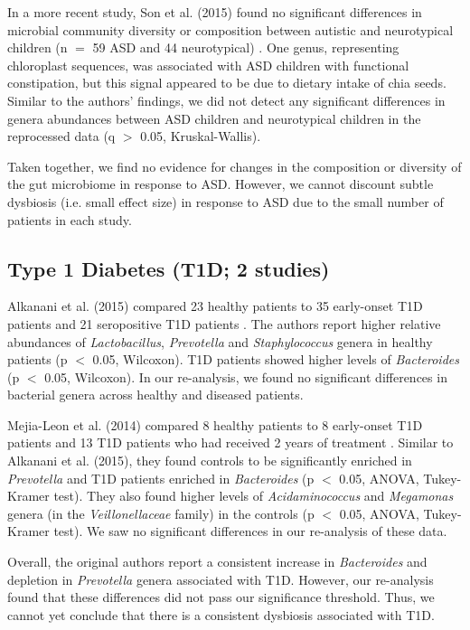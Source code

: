 \documentclass{article}
\begin{document}
{In a more recent study, Son et al. (2015) found no significant differences in microbial community diversity or composition between autistic and neurotypical children (n $=$ 59 ASD and 44 neurotypical) \cite{asd-son}. 
One genus, representing chloroplast sequences, was associated with ASD children with functional constipation, but this signal appeared to be due to dietary intake of chia seeds. 
Similar to the authors’ findings, we did not detect any significant differences in genera abundances between ASD children and neurotypical children in the reprocessed data (q $>$ 0.05, Kruskal-Wallis).

Taken together, we find no evidence for changes in the composition or diversity of the gut microbiome in response to ASD. 
However, we cannot discount subtle dysbiosis (i.e. small effect size) in response to ASD due to the small number of patients in each study.

\subsection*{Type 1 Diabetes (T1D; 2 studies)}

Alkanani et al. (2015) compared 23 healthy patients to 35 early-onset T1D patients and 21 seropositive T1D patients \cite{t1d-alkanani}. 
The authors report higher relative abundances of \textit{Lactobacillus}, \textit{Prevotella} and \textit{Staphylococcus} genera in healthy patients (p $<$ 0.05, Wilcoxon). 
T1D patients showed higher levels of \textit{Bacteroides} (p $<$ 0.05, Wilcoxon). 
In our re-analysis, we found no significant differences in bacterial genera across healthy and diseased patients.

Mejia-Leon et al. (2014) compared 8 healthy patients to 8 early-onset T1D patients and 13 T1D patients who had received 2 years of treatment \cite{t1d-mejia}. 
Similar to Alkanani et al. (2015), they found controls to be significantly enriched in \textit{Prevotella} and T1D patients enriched in \textit{Bacteroides} (p $<$ 0.05, ANOVA, Tukey-Kramer test). 
They also found higher levels of \textit{Acidaminococcus} and \textit{Megamonas} genera (in the \textit{Veillonellaceae} family) in the controls (p $<$ 0.05, ANOVA, Tukey-Kramer test). 
We saw no significant differences in our re-analysis of these data.

Overall, the original authors report a consistent increase in \textit{Bacteroides} and depletion in \textit{Prevotella} genera associated with T1D. 
However, our re-analysis found that these differences did not pass our significance threshold. 
Thus, we cannot yet conclude that there is a consistent dysbiosis associated with T1D.

}
\end{document}
